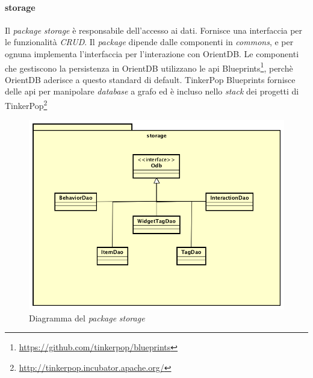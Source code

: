 \paragraph*{storage}
Il \emph{package} \emph{storage} è responsabile dell'accesso ai dati. Fornisce una interfaccia per le funzionalità \emph{CRUD}. Il \emph{package} dipende dalle componenti in \emph{commons}, e per ognuna implementa l'interfaccia per l'interazione con OrientDB. Le componenti che gestiscono la persistenza in OrientDB utilizzano le \gls{api} Blueprints\footnote{\url{https://github.com/tinkerpop/blueprints}}, perchè OrientDB aderisce a questo standard di default. TinkerPop Blueprints fornisce delle \gls{api} per manipolare \emph{database} a grafo ed è incluso nello \emph{stack} dei progetti di TinkerPop\footnote{\url{http://tinkerpop.incubator.apache.org/}}
\begin{figure}[h]
\centering
\includegraphics[scale=0.28]{immagini/storage}
\caption{Diagramma del \emph{package} \emph{storage}}
\label{fig:pack-storage}
\end{figure}
\newpage

